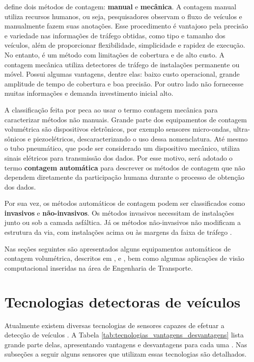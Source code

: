 \cite{goldner:2009:misc} define dois métodos de contagem: \textbf{manual} e \textbf{mecânica}. A contagem manual utiliza recursos humanos, ou seja, pesquisadores observam o fluxo de veículos e manualmente fazem suas anotações. Esse procedimento é vantajoso pela precisão e variedade nas informações de tráfego obtidas, como tipo e tamanho dos veículos, além de proporcionar flexibilidade, simplicidade e rapidez de execução. No entanto, é um método com limitações de cobertura e de alto custo. A contagem mecânica utiliza detectores de tráfego de instalações permanente ou móvel. Possui algumas vantagens, dentre elas: baixo custo operacional, grande amplitude de tempo de cobertura e boa precisão. Por outro lado não fornecesse muitas informações e demanda investimento inicial alto.

A classificação feita por \cite{goldner:2009:misc} peca ao usar o termo contagem mecânica para caracterizar métodos não manuais. Grande parte dos equipamentos de contagem volumétrica são dispositivos eletrônicos, por exemplo sensores micro-ondas, ultra-sônicos e piezoelétricos, descaracterizando o uso dessa nomenclatura. Até mesmo o tubo pneumático, que pode ser considerado um dispositivo mecânico, utiliza sinais elétricos para transmissão dos dados. Por esse motivo, será adotado o termo \textbf{contagem automática} para descrever os métodos de contagem que não dependem diretamente da participação humana durante o processo de obtenção dos dados.

Por sua vez, os métodos automáticos de contagem podem ser classificados como \textbf{invasivos} e \textbf{não-invasivos}. Os métodos invasivos necessitam de instalações junto ou sob a camada asfáltica. Já os métodos não-invasivos não modificam a estrutura da via, com instalações acima ou às margens da faixa de tráfego \citep{goldner:2009:misc}.

Nas seções seguintes são apresentados alguns equipamentos automáticos de contagem volumétrica, descritos em \cite{goldner:2009:misc}, \cite{almeida:2010:masther} e \cite{dnit:2011:online}, bem como algumas aplicações de visão computacional inseridas na área de Engenharia de Transporte.

\section{Tecnologias detectoras de veículos} %
\label{sec:tecnologias_detectoras_de_ve_culos}

Atualmente existem diversas tecnologias de sensores capazes de efetuar a detecção de veículos \citep{minnesota1997field}. A Tabela \ref{tab:tecnologias_vantagens_desvantagens} lista grande parte delas, apresentando vantagens e desvantagens para cada uma \citep{aguiar2008thesis}. Nas subseções a seguir alguns sensores que utilizam essas tecnologias são detalhados.

